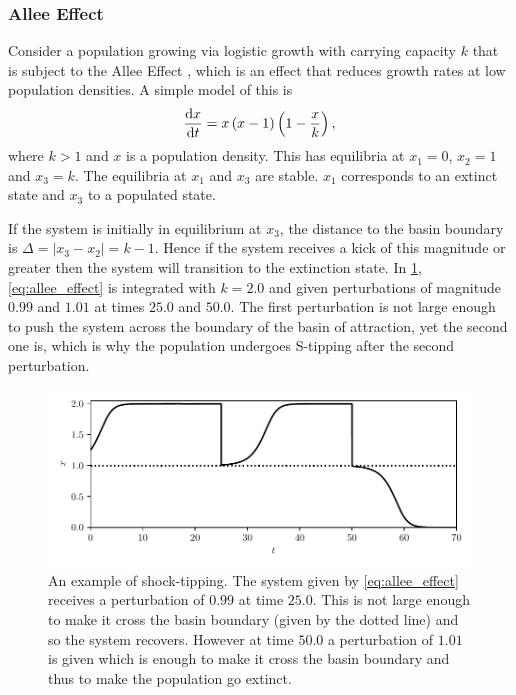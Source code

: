 \subsubsection{Allee Effect}
Consider a population growing via logistic growth with carrying capacity $k$ that is subject to the Allee Effect \parencite{Allee1932,Stephens1999}, which is an effect that reduces
growth rates at low population densities. A simple model of this is
\begin{equation}
  \label{eq:allee_effect}
  \dv{x}{t} = x\left(x-1\right)\left(1-\frac{x}{k}\right),
\end{equation}
where $k > 1$ and $x$ is a population density. This has equilibria at $x_1 = 0$, $x_2 = 1$ and $x_3 = k$. The equilibria at $x_1$ and $x_3$ are stable. $x_1$ corresponds to an extinct
state and $x_3$ to a populated state.

If the system is initially in equilibrium at $x_3$, the distance to the basin boundary is $\Delta = |x_3 - x_2| = k - 1$. Hence if the system receives a kick of
this magnitude or greater then the system will transition to the extinction state. In \cref{fig:shock_tipping}, \cref{eq:allee_effect} is integrated with $k = 2.0$ and given perturbations of
magnitude $0.99$ and $1.01$ at times $25.0$ and $50.0$. The first perturbation is not large enough to push the system across the boundary of the basin of attraction, yet the second one is,
which is why the population undergoes S-tipping after the second perturbation.

\begin{figure}
  \centering
  \includegraphics[width=\textwidth,keepaspectratio]{shock}
  \caption[Shock Tipping]{An example of shock-tipping. The system given by \cref{eq:allee_effect} receives a perturbation of $0.99$ at time $25.0$. This is not large enough to make it cross the basin boundary
    (given by the dotted line) and so the system recovers. However at time $50.0$ a perturbation of $1.01$ is given which is enough to make it cross the basin boundary and thus to make the
  population go extinct.}
  \label{fig:shock_tipping}
\end{figure}

